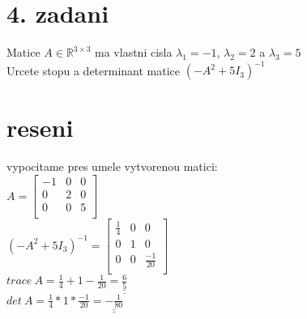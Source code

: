 \documentclass[a4paper]{article}
\def\doubleunderline#1{\underline{\underline{#1}}}
\begin{document}
\section*{4. zadani}
Matice $A\in\mathbb{R}^{3\times3}$ ma vlastni cisla
$\lambda_1=-1$, $\lambda_2=2$ a $\lambda_3=5$\\
Urcete stopu a determinant matice $(-A^2+5I_3)^{-1}$ 

\section*{reseni}
vypocitame pres umele vytvorenou matici:\\
$A=\left[\begin{matrix}
	-1 & 0 & 0\\
	0 & 2 & 0\\
	0 & 0 & 5\\
\end{matrix}\right]$\\
$(-A^2+5I_3)^{-1}=
\left[\begin{matrix}
	\frac{1}{4} & 0 & 0\\
	0 & 1 & 0\\
	0 & 0 & \frac{-1}{20}\\
\end{matrix}\right]$\\
$trace~A = \frac{1}{4}+1-\frac{1}{20} = \doubleunderline{\frac{6}{5}}$\\
$det~A = \frac{1}{4}*1*\frac{-1}{20} = \doubleunderline{-\frac{1}{80}}$\\
\end{document}
